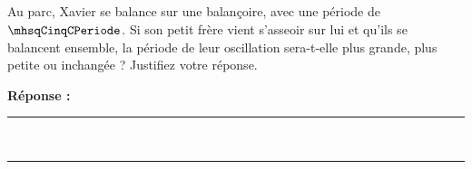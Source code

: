 \subsection{}
Au parc, Xavier se balance sur une balançoire, avec une période de $\mhsqCinqCPeriode$. Si son petit frère vient s’asseoir sur lui et qu’ils se balancent ensemble, la période de leur oscillation sera-t-elle plus grande, plus petite ou inchangée ? Justifiez votre réponse.

\noindent\textbf{Réponse :} \hrulefill \\[2.5ex]
\rule{\linewidth}{0.4pt} \\[2.5ex]
\rule{\linewidth}{0.4pt}
\vfill